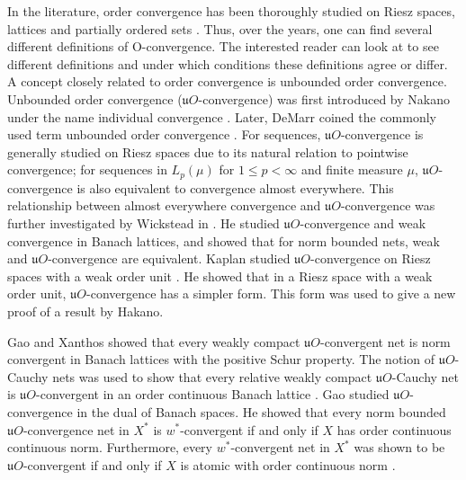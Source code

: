 \documentclass[12pt,a4paper]{amsart}
\numberwithin{equation}{section}
\theoremstyle{definition}
\begin{document}
In the literature, order convergence has been thoroughly studied on Riesz spaces, lattices and partially ordered sets \cite{GAOLEU17,MathewsAnderson1967, Rennie1951, WOLK1961}. Thus, over the years, one can find several different definitions of O-convergence. The interested reader can look at \cite{KAECWH} to see different definitions and under which conditions these definitions agree or differ. A concept closely related to order convergence is unbounded order convergence. Unbounded order convergence ($\mathfrak{u}O$-convergence) was first introduced by Nakano under the name individual convergence \cite{HAK41, HAK48}. Later, DeMarr coined the commonly used term unbounded order convergence \cite{DEMARR}.  For sequences, $\mathfrak{u}O$-convergence is generally studied on Riesz spaces due to its natural relation to pointwise convergence; for sequences in $L_{p}(\mu)$ for $1 \leq p < \infty$ and finite measure $\mu$, $\mathfrak{u}O$-convergence is also equivalent to convergence almost everywhere. This relationship between almost everywhere convergence and $\mathfrak{u}O$-convergence was further investigated by Wickstead in \cite{WIC77}. He studied $\mathfrak{u}O$-convergence and weak convergence in Banach lattices, and showed that for norm bounded nets, weak and $\mathfrak{u}O$-convergence are equivalent. Kaplan studied $\mathfrak{u}O$-convergence on Riesz spaces with a weak order unit \cite{kaplan}. He showed that in a Riesz space with a weak order unit, $\mathfrak{u}O$-convergence has a simpler form. This form was used to give a new proof of a result by Hakano.




Gao and Xanthos showed that every weakly compact $\mathfrak{u}O$-convergent net is norm convergent in Banach lattices with the positive Schur property. The notion of $\mathfrak{u}O$-Cauchy nets was used to show that every relative weakly compact $\mathfrak{u}O$-Cauchy net is $\mathfrak{u}O$-convergent in an order continuous Banach lattice \cite{GNX14}. Gao studied $\mathfrak{u}O$-convergence in the dual of Banach spaces. He showed that every norm bounded $\mathfrak{u}O$-convergence net in $X^{*}$ is $w^{*}$-convergent if and only if $X$ has order continuous continuous norm. Furthermore, every $w^{*}$-convergent net in $X^{*}$ was shown to be $\mathfrak{u}O$-convergent if and only if $X$ is atomic with order continuous norm \cite{GAO14}. 
\end{document}
